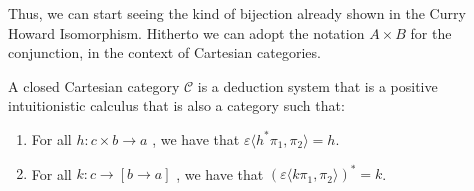Thus, we can start seeing the kind of bijection already shown in the Curry Howard Isomorphism. Hitherto we can adopt the notation $A\times B$ for the conjunction, in the context of Cartesian categories.
\begin{proposition}\label{def2:CCC}
  A closed Cartesian category $\mathcal{C}$ is a deduction system that is a positive intuitionistic calculus that is also a category such that:
  \begin{enumerate}
  \item   For all $h: c\times b \to a$ , we have that $\varepsilon \langle h^* \pi_1, \pi_2\rangle = h$.
  \item   For all $k: c\to [b \to a]$ , we have that $(\varepsilon \langle k \pi_1, \pi_2\rangle)^* = k$.
  \end{enumerate}
\end{proposition}

